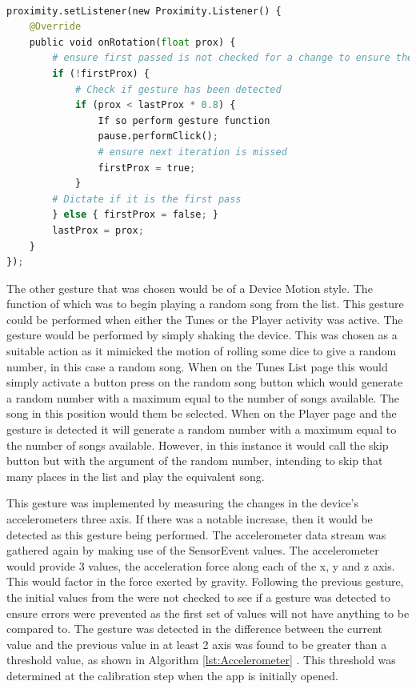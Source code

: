 \documentclass{l4proj}
\begin{document}
\begin{lstlisting}[language=python, float, caption={Java code detailing how the Pause/Play Gesture is detected and how it is acted upon.}, label=lst:Proximity]

proximity.setListener(new Proximity.Listener() {
    @Override
    public void onRotation(float prox) {
        # ensure first passed is not checked for a change to ensure there is a previous value to compare to
        if (!firstProx) {
            # Check if gesture has been detected
            if (prox < lastProx * 0.8) {
                If so perform gesture function
                pause.performClick();
                # ensure next iteration is missed
                firstProx = true;
            }
        # Dictate if it is the first pass
        } else { firstProx = false; }
        lastProx = prox;
    }
});
\end{lstlisting}

The other gesture that was chosen would be of a Device Motion style. The function of which was to begin playing a random song from the list. This gesture could be performed when either the Tunes or the Player activity was active. The gesture would be performed by simply shaking the device. This was chosen as a suitable action as it mimicked the motion of rolling some dice to give a random number, in this case a random song. When on the Tunes List page this would simply activate a button press on the random song button which would generate a random number with a maximum equal to the number of songs available. The song in this position would them be selected. When on the Player page and the gesture is detected it will generate a random number with a maximum equal to the number of songs available. However, in this instance it would call the skip button but with the argument of the random number, intending to skip that many places in the list and play the equivalent song.

This gesture was implemented by measuring the changes in the device's accelerometers three axis. If there was a notable increase, then it would be detected as this gesture being performed. The accelerometer data stream was gathered again by making use of the SensorEvent values. The accelerometer would provide 3 values, the acceleration force along each of the x, y and z axis. This would factor in the force exerted by gravity. Following the previous gesture, the initial values from the were not checked to see if a gesture was detected to ensure errors were prevented as the first set of values will not have anything to be compared to. The gesture was detected in the difference between the current value and the previous value in at least 2 axis was found to be greater than a threshold value, as shown in Algorithm \ref{lst:Accelerometer} . This threshold was determined at the calibration step when the app is initially opened.
\end{document}
